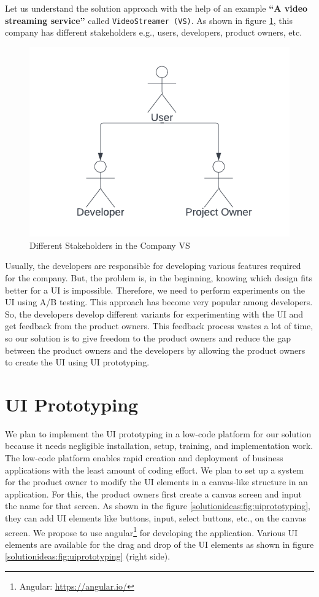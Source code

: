 Let us understand the solution approach with the help of an example \textbf{``A video streaming service''} called \texttt{VideoStreamer (VS)}.
As shown in figure \ref{solutionideas:fig:stakeholders}, this company has different stakeholders e.g., users, developers, product owners, etc.
\begin{figure}
    \centering
    \includegraphics[scale=0.36]{images/solution-ideas/Stakeholder.png}
    \caption{Different Stakeholders in the Company VS}
    \label{solutionideas:fig:stakeholders}
\end{figure}
Usually, the developers are responsible for developing various features required for the company. 
But, the problem is, in the beginning, knowing which design fits better for a UI is impossible. 
Therefore, we need to perform experiments on the UI using A/B testing.
This approach has become very popular among developers. 
So, the developers develop different variants for experimenting with the UI and get feedback from the product owners. 
This feedback process wastes a lot of time, so our solution is to give freedom to the product owners and reduce the gap between the product owners and the developers by allowing the product owners to create the UI using UI prototyping.


\section{UI Prototyping} 

We plan to implement the UI prototyping in a low-code platform for our solution because it needs negligible installation, setup, training, and implementation work. 
The low-code platform enables rapid creation and deployment of business applications with the least amount of coding effort. 
We plan to set up a system for the product owner to modify the UI elements in a canvas-like structure in an application. 
For this, the product owners first create a canvas screen and input the name for that screen. 
As shown in the figure \ref{solutionideas:fig:uiprototyping}, they can add UI elements like buttons, input, select buttons, etc., on the canvas screen. 
We propose to use angular\footnote{Angular: \url{https://angular.io/}} for developing the application. 
Various UI elements are available for the drag and drop of the UI elements as shown in figure \ref{solutionideas:fig:uiprototyping} (right side).

